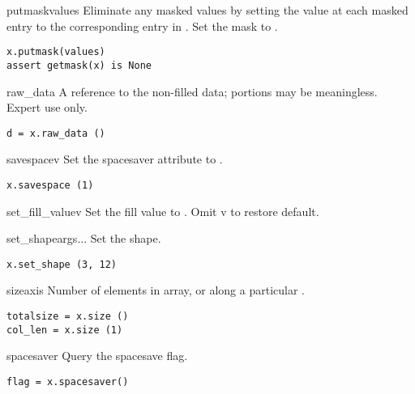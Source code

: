 \begin{methoddesc}[MaskedArray]{putmask}{values}
   Eliminate any masked values by setting the value at each masked entry to the
   corresponding entry in . Set the mask to .
\begin{verbatim}
x.putmask(values)
assert getmask(x) is None
\end{verbatim}
\end{methoddesc}

\begin{methoddesc}[MaskedArray]{raw_data}{}
   A reference to the non-filled data; portions may be meaningless. Expert use
   only. 
\begin{verbatim}
d = x.raw_data ()
\end{verbatim}
\end{methoddesc}

\begin{methoddesc}[MaskedArray]{savespace}{v}
   Set the spacesaver attribute to . 
\begin{verbatim}
x.savespace (1)
\end{verbatim}
\end{methoddesc}

\begin{methoddesc}[MaskedArray]{set_fill_value}{v}
   Set the fill value to . Omit v to restore default.
    
\end{methoddesc}

\begin{methoddesc}[MaskedArray]{set_shape}{args...}
   Set the shape. 
\begin{verbatim}
x.set_shape (3, 12)
\end{verbatim}
\end{methoddesc}

\begin{methoddesc}[MaskedArray]{size}{axis}
   Number of elements in array, or along a particular . 
\begin{verbatim}
totalsize = x.size ()
col_len = x.size (1)
\end{verbatim}
\end{methoddesc}

\begin{methoddesc}[MaskedArray]{spacesaver}{}
   Query the spacesave flag.
\begin{verbatim}
flag = x.spacesaver()
\end{verbatim}
\end{methoddesc}

